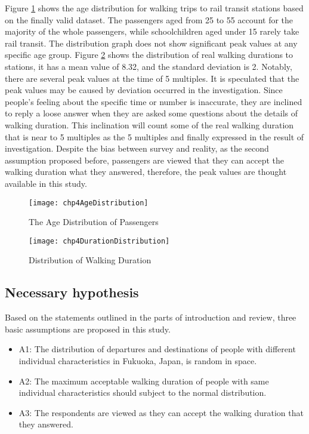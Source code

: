 %
Figure \ref{fig:chp4:AgeDistribution} shows the age distribution for walking trips to rail transit stations based on the finally valid dataset. The passengers aged from 25 to 55 account for the majority of the whole passengers, while schoolchildren aged under 15 rarely take rail transit. The distribution graph does not show significant peak values at any specific age group. Figure \ref{fig:chp4:DurationDistribution} shows the distribution of real walking durations to stations, it has a mean value of 8.32, and the standard deviation is 2. Notably, there are several peak values at the time of 5 multiples. It is speculated that the peak values may be caused by deviation occurred in the investigation. Since people's feeling about the specific time or number is inaccurate, they are inclined to reply a loose answer when they are asked some questions about the details of walking duration. This inclination will count some of the real walking duration that is near to 5 multiples as the 5 multiples and finally expressed in the result of investigation. Despite the bias between survey and reality, as the second assumption proposed before, passengers are viewed that they can accept the walking duration what they answered, therefore, the peak values are thought available in this study.

\begin{figure}[htbp]
	\centering
	\texttt{[image: chp4AgeDistribution]}
	\caption{The Age Distribution of Passengers}
	\label{fig:chp4:AgeDistribution}
\end{figure}

\begin{figure}[htbp]
	\centering
	\texttt{[image: chp4DurationDistribution]}
	\caption{Distribution of Walking Duration}
	\label{fig:chp4:DurationDistribution}
\end{figure}

%
\subsection{Necessary hypothesis}
Based on the statements outlined in the parts of introduction and review, three basic assumptions are proposed in this study.

\begin{itemize}
	\item A1: The distribution of departures and destinations of people with different individual characteristics in Fukuoka, Japan, is random in space. 
	
	\item A2: The maximum acceptable walking duration of people with same individual characteristics should subject to the normal distribution. 
	
	\item A3: The respondents are viewed as they can accept the walking duration that they answered.
\end{itemize}

